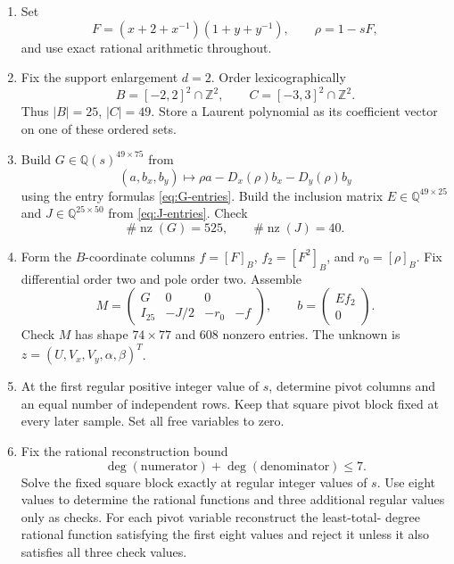 \documentclass[11pt,fleqn]{article}
\theoremstyle{plain}
\newcommand{\Dx}{D_x}
\newcommand{\Dy}{D_y}
\begin{document}
\begingroup
\fontsize{9.25}{10.65}\selectfont
\begin{enumerate}[label=\texttt{\arabic*.},leftmargin=2.7em,itemsep=0.25em,topsep=0pt]
\item Set
\[
 F=(x+2+x^{-1})(1+y+y^{-1}),\qquad \rho=1-sF,
\]
and use exact rational arithmetic throughout.

\item Fix the support enlargement \(d=2\).  Order lexicographically
\[
 B=[-2,2]^2\cap\mathbb Z^2,\qquad
 C=[-3,3]^2\cap\mathbb Z^2.
\]
Thus \(|B|=25\), \(|C|=49\).  Store a Laurent polynomial as its coefficient
vector on one of these ordered sets.

\item Build \(G\in\mathbb Q(s)^{49\times75}\) from
\[
 (a,b_x,b_y)\longmapsto \rho a-\Dx(\rho)b_x-\Dy(\rho)b_y
\]
using the entry formulas \eqref{eq:G-entries}.  Build the inclusion matrix
\(E\in\mathbb Q^{49\times25}\) and
\(J\in\mathbb Q^{25\times50}\) from \eqref{eq:J-entries}.  Check
\[
 \#\operatorname{nz}(G)=525,\qquad
 \#\operatorname{nz}(J)=40.
\]

\item Form the \(B\)-coordinate columns \(f=[F]_B\),
\(f_2=[F^2]_B\), and \(r_0=[\rho]_B\).  Fix differential order two and pole
order two.  Assemble
\[
 M=
 \begin{pmatrix}
   G&0&0\\
   I_{25}&-J/2&-r_0&-f
 \end{pmatrix},\qquad
 b=\begin{pmatrix}Ef_2\\0\end{pmatrix}.
\]
Check \(M\) has shape \(74\times77\) and 608 nonzero entries.  The unknown is
\(z=(U,V_x,V_y,\alpha,\beta)^T\).

\item At the first regular positive integer value of \(s\), determine pivot
columns and an equal number of independent rows.  Keep that square pivot block
fixed at every later sample.  Set all free variables to zero.

\item Fix the rational reconstruction bound
\[
 \deg(\text{numerator})+\deg(\text{denominator})\le7.
\]
Solve the fixed square block exactly at regular integer values of \(s\).  Use
eight values to determine the rational functions and three additional regular
values only as checks.  For each pivot variable reconstruct the least-total-
degree rational function satisfying the first eight values and reject it unless
it also satisfies all three check values.


\end{enumerate}
\end{document}
